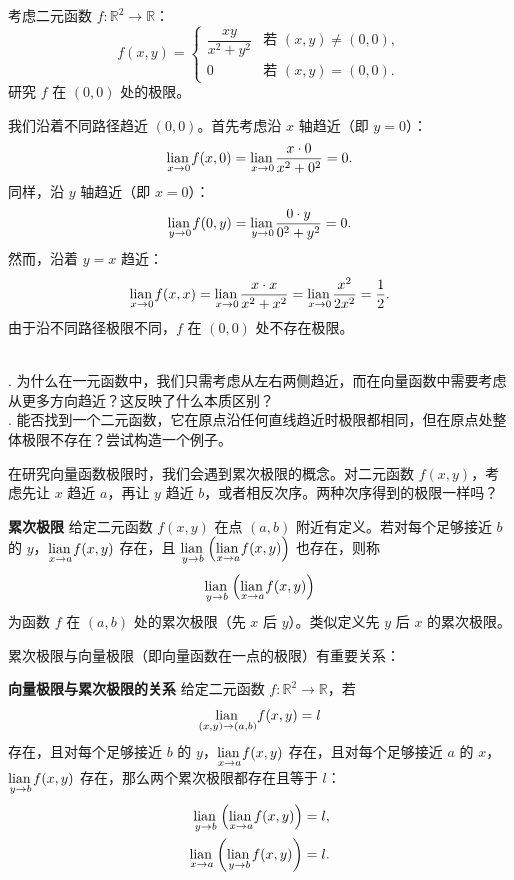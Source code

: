 \documentclass[12pt,UTF8,fontset=none]{ctexbook}
\begin{document}
\begin{ex}
考虑二元函数 $f: \mathbb{R}^2 \to \mathbb{R}$：
$$ f(x, y) = \begin{cases}
\dfrac{xy}{x^2+y^2} & \text{若 } (x, y) \neq (0, 0), \\
0 & \text{若 } (x, y) = (0, 0).
\end{cases} $$
研究 $f$ 在 $(0, 0)$ 处的极限。

我们沿着不同路径趋近 $(0, 0)$。首先考虑沿 $x$ 轴趋近（即 $y=0$）：
$$ \underset{x\to 0}{\operatorname{lian}\,} f(x, 0) = \underset{x\to 0}{\operatorname{lian}\,} \frac{x\cdot 0}{x^2+0^2} = 0. $$
同样，沿 $y$ 轴趋近（即 $x=0$）：
$$ \underset{y\to 0}{\operatorname{lian}\,} f(0, y) = \underset{y\to 0}{\operatorname{lian}\,} \frac{0\cdot y}{0^2+y^2} = 0. $$
然而，沿着 $y=x$ 趋近：
$$ \underset{x\to 0}{\operatorname{lian}\,} f(x, x) = \underset{x\to 0}{\operatorname{lian}\,} \frac{x\cdot x}{x^2+x^2} = \underset{x\to 0}{\operatorname{lian}\,} \frac{x^2}{2x^2} = \frac{1}{2}. $$
由于沿不同路径极限不同，$f$ 在 $(0, 0)$ 处不存在极限。
\end{ex}

\begin{sk}
\mbox{} \\
. 为什么在一元函数中，我们只需考虑从左右两侧趋近，而在向量函数中需要考虑从更多方向趋近？这反映了什么本质区别？\\
. 能否找到一个二元函数，它在原点沿任何直线趋近时极限都相同，但在原点处整体极限不存在？尝试构造一个例子。
\end{sk}

在研究向量函数极限时，我们会遇到累次极限的概念。对二元函数 $f(x, y)$，考虑先让 $x$ 趋近 $a$，再让 $y$ 趋近 $b$，或者相反次序。两种次序得到的极限一样吗？

\begin{df}{\textbf{累次极限}}
给定二元函数 $f(x, y)$ 在点 $(a, b)$ 附近有定义。若对每个足够接近 $b$ 的 $y$，$\underset{x\to a}{\operatorname{lian}\,} f(x, y)$ 存在，且 $\underset{y\to b}{\operatorname{lian}\,} \left(\underset{x\to a}{\operatorname{lian}\,} f(x, y)\right)$ 也存在，则称
$$ \underset{y\to b}{\operatorname{lian}\,} \left(\underset{x\to a}{\operatorname{lian}\,} f(x, y)\right) $$
为函数 $f$ 在 $(a, b)$ 处的累次极限（先 $x$ 后 $y$）。类似定义先 $y$ 后 $x$ 的累次极限。
\end{df}

累次极限与向量极限（即向量函数在一点的极限）有重要关系：

\begin{tm}{\textbf{向量极限与累次极限的关系}}
给定二元函数 $f: \mathbb{R}^2 \rightarrow \mathbb{R}$，若
$$ \underset{(x,y)\to (a,b)}{\operatorname{lian}\,} f(x, y) = l $$
存在，且对每个足够接近 $b$ 的 $y$，$\underset{x\to a}{\operatorname{lian}\,} f(x, y)$ 存在，且对每个足够接近 $a$ 的 $x$，$\underset{y\to b}{\operatorname{lian}\,} f(x, y)$ 存在，那么两个累次极限都存在且等于 $l$：
\begin{align*}
\underset{y\to b}{\operatorname{lian}\,} \left(\underset{x\to a}{\operatorname{lian}\,} f(x, y)\right) &= l, \\
\underset{x\to a}{\operatorname{lian}\,} \left(\underset{y\to b}{\operatorname{lian}\,} f(x, y)\right) &= l.
\end{align*}
\end{tm}
\end{document}
